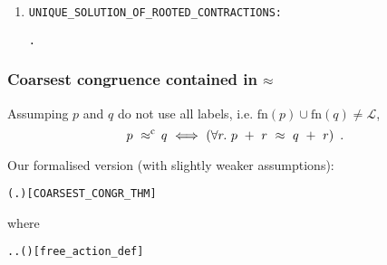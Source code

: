 \begin{frame}
\begin{small}
\begin{enumerate}
\begin{alltt}
\end{alltt}
\item \texttt{UNIQUE_SOLUTION_OF_ROOTED_CONTRACTIONS:}
\begin{alltt}
\HOLTokenTurnstile{}   \HOLSymConst{\HOLTokenImp{}} \HOLSymConst{\HOLTokenForall{}} .  \HOLSymConst{\HOLTokenObsContracts}   \HOLSymConst{\HOLTokenConj{}}  \HOLSymConst{\HOLTokenObsContracts}   \HOLSymConst{\HOLTokenImp{}}  \HOLSymConst{\HOLTokenObsCongr} 
\end{alltt}
\end{enumerate}
\end{small}
\end{frame}

\begin{frame}
\frametitle{Coarsest congruence contained in $\approx$}
\begin{theorem}
Assumping $p$ and $q$ do not use all labels, i.e. $\mathrm{fn}(p) \cup
\mathrm{fn}(q) \neq \mathscr{L}$,
\begin{equation*}
p\ \mathrel{\approx^{\mathrm{c}}}\ \! q\ \Longleftrightarrow\ ( \forall r.\ p\ +\
r\ \approx\ q\ +\ r )\enspace.
\end{equation*}
\end{theorem}
Our formalised version (with slightly weaker assumptions):
\begin{small}
\begin{alltt}
\HOLTokenTurnstile{}   \HOLSymConst{\HOLTokenConj{}}   \HOLSymConst{\HOLTokenImp{}}
   ( \HOLSymConst{\HOLTokenObsCongr} \HOLFreeVar{q} \HOLSymConst{\HOLTokenEquiv{}} \HOLSymConst{\HOLTokenForall{}}\HOLBoundVar{r}. \HOLFreeVar{p} \HOLSymConst{\ensuremath{+}}  \HOLSymConst{\HOLTokenWeakEQ}  \HOLSymConst{\ensuremath{+}} )\hfill{[COARSEST_CONGR_THM]}
\end{alltt}
where
\begin{alltt}
  \HOLSymConst{\HOLTokenEquiv{}} \HOLSymConst{\HOLTokenExists{}}. \HOLSymConst{\HOLTokenForall{}}. \HOLSymConst{\HOLTokenNeg{}}( \HOLTokenWeakTransBegin{} \HOLTokenWeakTransEnd {})\hfill{[free_action_def]}
\end{alltt}
\end{small}
\end{frame}

